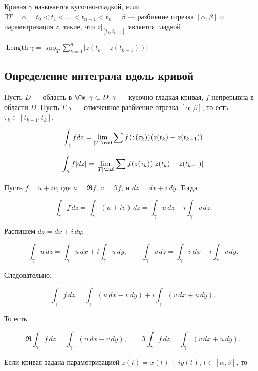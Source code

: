 \begin{definition}
    Кривая \(\gamma\) называется кусочно-гладкой, если \(\exists T = \alpha = t_0 < t_1 < \dots < t_{n - 1} < t_n = \beta\) --- разбиение отрезка \([\alpha, \beta]\) и параметризация \(z\), такие, что \(z|_{[t_k, t_{k + 1}]}\) является гладкой
\end{definition}

\begin{definition}
    \(\operatorname{Length} \gamma = \sup_T \sum_{k = 0}^n |z(t_k - z(t_{k - 1}))|\)
\end{definition}

\subsection{Определение интеграла вдоль кривой}

Пусть \(D\) --- область в \(\Cm, \gamma \subset D, \gamma\) --- кусочно-гладкая кривая, \(f\) непрерывна в области \(D\). Пусть \(T, \tau\) --- отмеченное разбиение отрезка \([\alpha, \beta]\), то есть \(\tau_k \in [t_{k - 1}, t_k]\). 

\begin{definition}
    \[\int_\gamma fdz = \lim_{|T| \ra 0} \sum_{} f(z(\tau_k))(z(t_k) - z(t_{k - 1}))\]
\end{definition}
\begin{definition}
    \[\int_\gamma f|dz| = \lim_{|T| \ra 0} \sum_{} f(z(\tau_k))|z(t_k) - z(t_{k - 1})|\]
\end{definition}

Пусть \(f=u+iv\), где \(u=\Re f,\ v=\Im f\), и \(dz=dx+i\,dy\). Тогда

\[
\int_\gamma f\,dz
=
\int_\gamma (u+iv)\,dz
=
\int_\gamma u\,dz+i\int_\gamma v\,dz.
\]

Распишем \(dz=dx+i\,dy\):

\[
\int_\gamma u\,dz
=
\int_\gamma u\,dx+i\int_\gamma u\,dy,
\qquad
\int_\gamma v\,dz
=
\int_\gamma v\,dx+i\int_\gamma v\,dy.
\]

Следовательно,

\[
\int_\gamma f\,dz
=
\int_\gamma (u\,dx-v\,dy)
+
i\int_\gamma (v\,dx+u\,dy).
\]

То есть

\[
\Re\int_\gamma f\,dz
=
\int_\gamma (u\,dx-v\,dy),
\qquad
\Im\int_\gamma f\,dz
=
\int_\gamma (v\,dx+u\,dy).
\]

Если кривая задана параметризацией \(z(t)=x(t)+iy(t)\), \(t\in[\alpha,\beta]\), то

